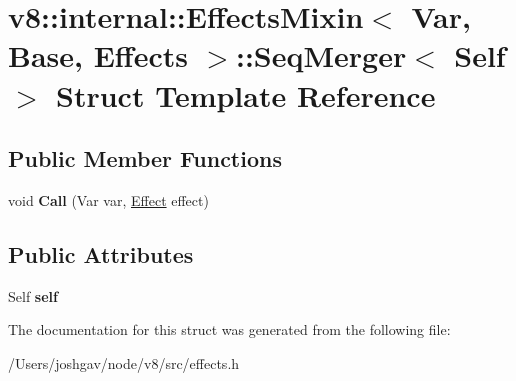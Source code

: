 \hypertarget{structv8_1_1internal_1_1_effects_mixin_1_1_seq_merger}{}\section{v8\+:\+:internal\+:\+:Effects\+Mixin$<$ Var, Base, Effects $>$\+:\+:Seq\+Merger$<$ Self $>$ Struct Template Reference}
\label{structv8_1_1internal_1_1_effects_mixin_1_1_seq_merger}
\subsection*{Public Member Functions}
\begin{DoxyCompactItemize}
\item 
void {\bfseries Call} (Var var, \hyperlink{structv8_1_1internal_1_1_effect}{Effect} effect)\hypertarget{structv8_1_1internal_1_1_effects_mixin_1_1_seq_merger_a15265437b76878b11d9b2a0332ea6b96}{}\label{structv8_1_1internal_1_1_effects_mixin_1_1_seq_merger_a15265437b76878b11d9b2a0332ea6b96}

\end{DoxyCompactItemize}
\subsection*{Public Attributes}
\begin{DoxyCompactItemize}
\item 
Self {\bfseries self}\hypertarget{structv8_1_1internal_1_1_effects_mixin_1_1_seq_merger_aab26b00017d02e6458ba0d2726e3caac}{}\label{structv8_1_1internal_1_1_effects_mixin_1_1_seq_merger_aab26b00017d02e6458ba0d2726e3caac}

\end{DoxyCompactItemize}


The documentation for this struct was generated from the following file\+:\begin{DoxyCompactItemize}
\item 
/\+Users/joshgav/node/v8/src/effects.\+h\end{DoxyCompactItemize}
